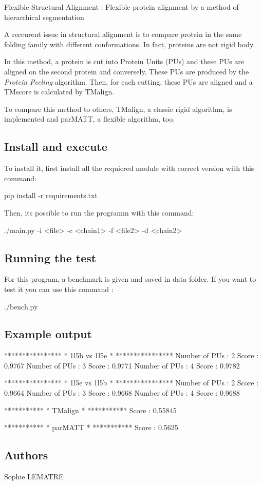 Flexible Structural Alignment \+: Flexible protein alignment by a method of hierarchical segmentation

A reccurent issue in structural alignment is to compare protein in the same folding family with different conformations. In fact, proteins are not rigid body.

In this method, a protein is cut into Protein Units (P\+Us) and these P\+Us are aligned on the second protein and conversely. These P\+Us are produced by the {\itshape Protein Peeling} algorithm. Then, for each cutting, these P\+Us are aligned and a T\+Mscore is calculated by T\+Malign.

To compare this method to others, T\+Malign, a classic rigid algorithm, is implemented and par\+M\+A\+TT, a flexible algorithm, too.

\subsection*{Install and execute}

To install it, first install all the requiered module with correct version with this command\+: 
\begin{DoxyCode}
pip install -r requirements.txt
\end{DoxyCode}


Then, it\textquotesingle{}s possible to run the programm with this command\+: 
\begin{DoxyCode}
./main.py -i <file> -c <chain1> -f <file2> -d <chain2>
\end{DoxyCode}


\subsection*{Running the test}

For this program, a benchmark is given and saved in data folder. If you want to test it you can use this command \+: 
\begin{DoxyCode}
./bench.py
\end{DoxyCode}


\subsection*{Example output}

 
\begin{DoxyCode}
        ****************
        * 1l5b vs 1l5e *
        ****************
Number of PUs :  2                 Score : 0.9767
Number of PUs :  3                 Score : 0.9771
Number of PUs :  4                 Score : 0.9782

        ****************
        * 1l5e vs 1l5b *
        ****************
Number of PUs :  2                 Score : 0.9664
Number of PUs :  3                 Score : 0.9668
Number of PUs :  4                 Score : 0.9688

          ***********
          * TMalign *
          ***********
Score : 0.55845


          ***********
          * parMATT *
          ***********
Score : 0.5625
\end{DoxyCode}


\subsection*{Authors}

Sophie L\+E\+M\+A\+T\+RE 